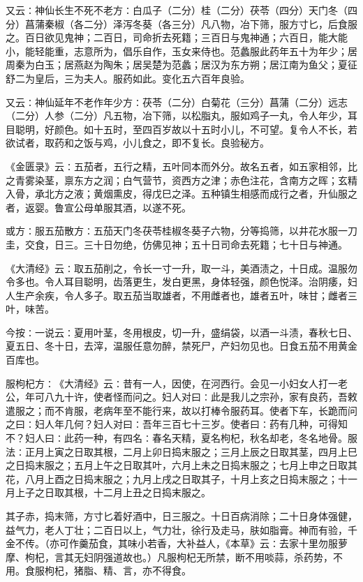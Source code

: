 \documentclass[a4paper,12pt,UTF8,twoside]{ctexbook}
\begin{document}
又云∶神仙长生不死不老方∶白瓜子（二分）桂（二分）茯苓（四分）天门冬（四分）菖蒲秦椒（各二分）泽泻冬葵（各三分）凡八物，冶下筛，服方寸匕，后食服之。百日欲见鬼神；二百日，司命折去死籍；三百日与鬼神通；六百日，能大能小，能轻能重，志意所为，倡乐自作，玉女来侍也。范蠡服此药年五十为年少；居周秦为白玉；居燕赵为陶朱；居吴楚为范蠡；居汉为东方朔；居江南为鱼父；夏征舒二为皇后，三为夫人。服药如此。变化五六百年良验。

又云∶神仙延年不老作年少方∶茯苓（二分）白菊花（三分）菖蒲（二分）远志（二分）人参（二分）凡五物，冶下筛，以松脂丸，服如鸡子一丸，令人年少，耳目聪明，好颜色。如十五时，至四百岁故以十五时小儿，不可望。复令人不长，若欲试者，取药和之饭与鸡，小儿食之，即不复长。良验秘方。

《金匮录》云∶五茄者，五行之精，五叶同本而外分。故名五者，如五家相邻，比之青雾染茎，禀东方之润；白气营节，资西方之津；赤色注花，含南方之晖；玄精入骨，承北方之液；黄烟熏皮，得戊巳之泽。五种镇生相感而成行之者，升仙服之者，返婴。鲁宣公母单服其酒，以遂不死。

或方∶服五茄散方∶五茄天门冬茯苓桂椒冬葵子六物，分等捣筛，以井花水服一刀圭，交食，日三。三十日勿绝，仿佛见神；五十日司命去死籍；七十日与神通。

《大清经》云∶取五茄削之，令长一寸一升，取一斗，美酒渍之，十日成。温服勿令多也。令人耳目聪明，齿落更生，发白更黑，身体轻强，颜色悦泽。治阴痿，妇人生产余疾，令人多子。取五茄当取雄者，不用雌者也，雄者五叶，味甘；雌者三叶，味苦。

今按∶一说云∶夏用叶茎，冬用根皮，切一升，盛绢袋，以酒一斗渍，春秋七日、夏五日、冬十日，去滓，温服任意勿醉，禁死尸，产妇勿见也。日食五茄不用黄金百库也。

服枸杞方∶《大清经》云∶昔有一人，因使，在河西行。会见一小妇女人打一老公，年可八九十许，使者怪而问之。妇人对曰∶此是我儿之宗孙，家有良药，吾敕遣服之；而不肯服，老病年至不能行来，故以打棒令服药耳。使者下车，长跪而问之曰∶妇人年几何？妇人对曰∶吾年三百七十三岁。使者曰∶药有几种，可得知不？妇人曰∶此药一种，有四名∶春名天精，夏名枸杞，秋名却老，冬名地骨。服法∶正月上寅之日取其根，二月上卯日捣末服之；三月上辰之日取其茎，四月上巳之日捣末服之；五月上午之日取其叶，六月上未之日捣末服之；七月上申之日取其花，八月上酉之日捣末服之；九月上戌之日取其子，十月上亥之日捣末服之；十一月上子之日取其根，十二月上丑之日捣末服之。

其子赤，捣末筛，方寸匕着好酒中，日三服之。十日百病消除；二十日身体强健，益气力，老人丁壮；二百日以上，气力壮，徐行及走马，肤如脂膏。神而有验，千金不传。（亦可作羹茄食，其味小若香，大补益人，《本草》云∶去家十里勿服萝摩、枸杞，言其无妇阴强道故也。）凡服枸杞无所禁，断不用啖蒜，杀药势，不用。食服枸杞，猪脂、精、言，亦不得食。
\end{document}
